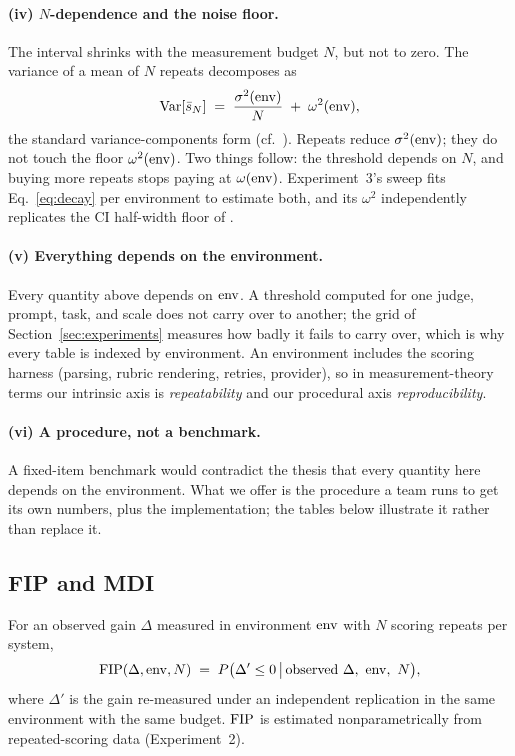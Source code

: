 \paragraph{(iv) $N$-dependence and the noise floor.}
The interval shrinks with the measurement budget $N$, but not to zero. The
variance of a mean of $N$ repeats decomposes as
\begin{equation}
  \label{eq:decay}
  \operatorname{Var}\!\left[\bar{s}_N\right]
    \;=\; \frac{\sigma^2(\mathrm{env})}{N} \;+\; \omega^2(\mathrm{env}),
\end{equation}
the standard variance-components form (cf.\
\citealp{miller2024errorbars, messing2026tee}). Repeats reduce
$\sigma^2(\mathrm{env})$; they do not touch the floor $\omega^2(\mathrm{env})$. Two things
follow: the threshold depends on $N$, and buying more repeats stops paying at
$\omega(\mathrm{env})$. Experiment~3's sweep fits Eq.~\eqref{eq:decay} per environment
to estimate both, and its $\omega^2$ independently replicates the CI
half-width floor of \citet{messing2026tee}.

\paragraph{(v) Everything depends on the environment.}
Every quantity above depends on $\mathrm{env}$. A threshold computed for one judge,
prompt, task, and scale does not carry over to another; the grid of
Section~\ref{sec:experiments} measures how badly it fails to carry over, which
is why every table is indexed by environment.
An environment includes the scoring harness (parsing, rubric rendering,
retries, provider), so in measurement-theory terms our intrinsic axis is
\emph{repeatability} and our procedural axis \emph{reproducibility}.

\paragraph{(vi) A procedure, not a benchmark.}
A fixed-item benchmark would contradict the thesis that every quantity here
depends on the environment. What we offer is the procedure a team runs to get
its own numbers, plus the implementation; the tables below illustrate it rather
than replace it.

\subsection{FIP and MDI}
\label{sec:framework-defs}

\begin{definition}
  \label{def:fip}
  For an observed gain $\Delta$ measured in environment $\mathrm{env}$ with $N$
  scoring repeats per system,
  \begin{equation*}
    \fip(\Delta, \env, N)
      \;=\; P\bigl(\Delta' \le 0 \,\big|\, \text{observed } \Delta,\ \env,\ N\bigr),
  \end{equation*}
  where $\Delta'$ is the gain re-measured under an independent replication
  in the same environment with the same budget. $\mathrm{FIP}$ is estimated
  nonparametrically from repeated-scoring data (Experiment~2).
\end{definition}

